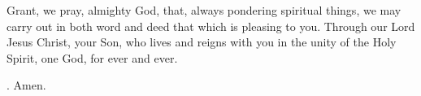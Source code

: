 \lettrine[lines=3]{G}{}rant, we pray, almighty God,
that, always pondering spiritual things,
we may carry out in both word and deed
that which is pleasing to you.
Through our Lord Jesus Christ, your Son,
who lives and reigns with you in the unity of the Holy Spirit,
one God, for ever and ever. \par \Rbar. Amen.

